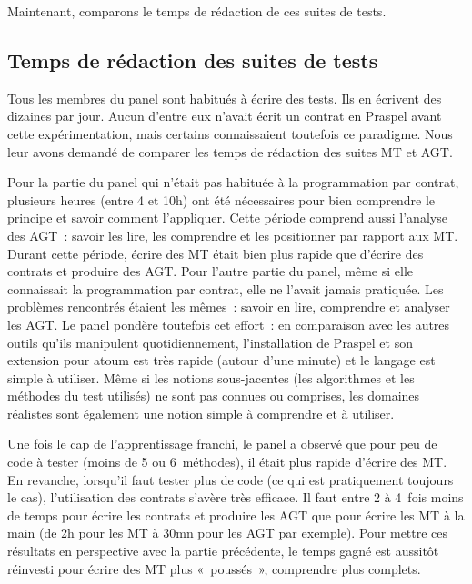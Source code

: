 Maintenant, comparons le temps de rédaction de ces suites de tests.

\subsection{Temps de rédaction des suites de tests}
\label{subsection:experimentation:time}

%

Tous les membres du panel sont habitués à écrire des tests. Ils en écrivent des
dizaines par jour. Aucun d'entre eux n'avait écrit un contrat en Praspel avant
cette expérimentation, mais certains connaissaient toutefois ce paradigme. Nous
leur avons demandé de comparer les temps de rédaction des suites MT et AGT.

Pour la partie du panel qui n'était pas habituée à la programmation par contrat,
plusieurs heures (entre 4 et 10h) ont été nécessaires pour bien comprendre le
principe et savoir comment l'appliquer. Cette période comprend aussi l'analyse
des AGT~: savoir les lire, les comprendre et les positionner par rapport aux MT.
Durant cette période, écrire des MT était bien plus rapide que d'écrire des
contrats et produire des AGT. Pour l'autre partie du panel, même si elle
connaissait la programmation par contrat, elle ne l'avait jamais pratiquée. Les
problèmes rencontrés étaient les mêmes~: savoir en lire, comprendre et analyser
les AGT. Le panel pondère toutefois cet effort~: en comparaison avec les autres
outils qu'ils manipulent quotidiennement, l'installation de Praspel et son
extension pour atoum est très rapide (autour d'une minute) et le langage est
simple à utiliser.  Même si les notions sous-jacentes (les algorithmes et les
méthodes du test utilisés) ne sont pas connues ou comprises, les domaines
réalistes sont également une notion simple à comprendre et à utiliser.

Une fois le cap de l'apprentissage franchi, le panel a observé que pour peu de
code à tester (moins de 5 ou 6~méthodes), il était plus rapide d'écrire des MT.
En revanche, lorsqu'il faut tester plus de code (ce qui est pratiquement
toujours le cas), l'utilisation des contrats s'avère très efficace. Il faut
entre 2 à 4~fois moins de temps pour écrire les contrats et produire les AGT que
pour écrire les MT à la main (de 2h pour les MT à 30mn pour les AGT par
exemple). Pour mettre ces résultats en perspective avec la partie précédente, le
temps gagné est aussitôt réinvesti pour écrire des MT plus «~poussés~»,
comprendre plus complets.

